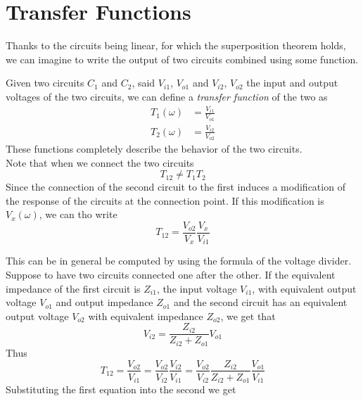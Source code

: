 \documentclass[../electromagnetism.tex]{subfiles}
\begin{document}
\section{Transfer Functions}
Thanks to the circuits being linear, for which the superposition theorem holds, we can imagine to write the output of two circuits combined using some function.
\begin{dfn}
	Given two circuits $C_1$ and $C_2$, said $V_{i1}$, $V_{o1}$ and $V_{i2}$, $V_{o2}$ the input and output voltages of the two circuits, we can define a \textit{transfer function} of the two as
	\begin{equation}
		\begin{aligned}
			T_{1}(\omega)&= \frac{V_{i1}}{V_{o1}}\\
			T_{2}(\omega)&= \frac{V_{i2}}{V_{o2}}
		\end{aligned}
		\label{eq:transferfuncdef.trf}
	\end{equation}
	These functions completely describe the behavior of the two circuits.\\
	Note that when we connect the two circuits
	\begin{equation*}
		T_{12}\ne T_1T_2
	\end{equation*}
	Since the connection of the second circuit to the first induces a modification of the response of the circuits at the connection point. If this modification is $V_x(\omega)$, we can tho write
	\begin{equation}
		T_{12}=\frac{V_{o2}}{V_{x}}\frac{V_x}{V_{i1}}
		\label{eq:transferfunc2.trf}
	\end{equation}
\end{dfn}
This can be in general be computed by using the formula of the voltage divider. Suppose to have two circuits connected one after the other. If the equivalent impedance of the first circuit is $Z_{i1}$, the input voltage $V_{i1}$, with equivalent output voltage $V_{o1}$ and output impedance $Z_{o1}$ and the second circuit has an equivalent output voltage $V_{o2}$ with equivalent impedance $Z_{o2}$, we get that
	\begin{equation*}
		V_{i2}=\frac{Z_{i2}}{Z_{i2}+Z_{o1}}V_{o1}
	\end{equation*}
	Thus
	\begin{equation*}
		T_{12}=\frac{V_{o2}}{V_{i1}}=\frac{V_{o2}}{V_{i2}}\frac{V_{i2}}{V_{i1}}=\frac{V_{o2}}{V_{i2}}\frac{Z_{i2}}{Z_{i2}+Z_{o1}}\frac{V_{o1}}{V_{i1}}
	\end{equation*}
	Substituting the first equation into the second we get
\end{document}
